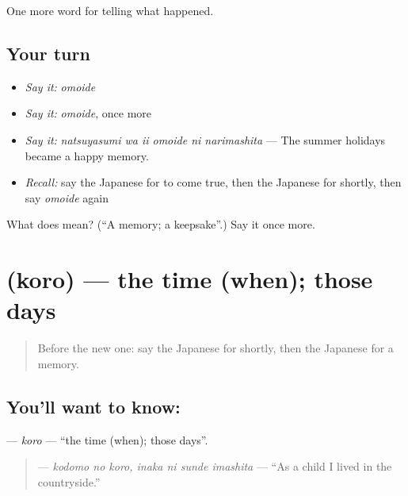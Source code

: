 \begin{grammarlens}[title={What you've built}]
One more word for telling what happened.
\end{grammarlens}

\subsection*{Your turn}
\begin{itemize}
\raggedright
  \item \emph{Say it:} \emph{omoide}
  \item \emph{Say it:} \emph{omoide}, once more
  \item \emph{Say it:} \emph{natsuyasumi wa ii omoide ni narimashita} — The summer holidays became a happy memory.
  \item \emph{Recall:} say the Japanese for to come true, then the Japanese for shortly, then say \emph{omoide} again
\end{itemize}

\begin{tcolorbox}[breakable,colback=teal!4,colframe=teal!35!black,title={Before you move on}]
What does  mean? (\textquotedblleft{}A memory; a keepsake\textquotedblright{}.) Say it once more.
\end{tcolorbox}
\section[\texorpdfstring{\ja{ころ} (koro)}{ころ (koro)}]{ (koro) — the time (when); those days}

\label{lesson:JA-C311-koro}



\begin{quote}
Before the new one: say the Japanese for shortly, then the Japanese for a memory.
\end{quote}

\subsection*{You'll want to know: }
\textbf{} — \emph{koro} — \textquotedblleft{}the time (when); those days\textquotedblright{}.

\begin{quote}
\textbf{  } — \emph{kodomo no koro, inaka ni sunde imashita} — \textquotedblleft{}As a child I lived in the countryside.\textquotedblright{}
\end{quote}

